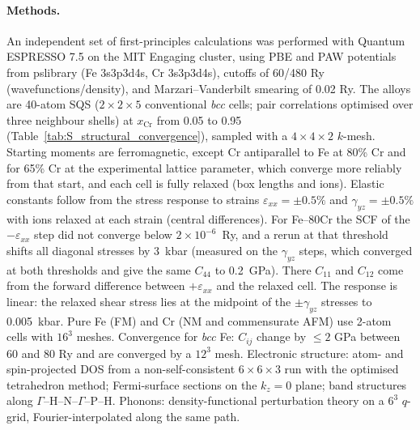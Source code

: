 \documentclass[final,3p,times]{elsarticle}
\begin{document}
\paragraph{Methods.} An independent set of first-principles calculations was performed with Quantum ESPRESSO 7.5 \cite{giannozzi2009quantum,giannozzi2017advanced} on the MIT Engaging cluster, using PBE \cite{pbe1996} and PAW potentials from pslibrary (Fe 3s3p3d4s, Cr 3s3p3d4s), cutoffs of 60/480 Ry (wavefunctions/density), and Marzari--Vanderbilt smearing of 0.02 Ry. The alloys are 40-atom SQS ($2\times2\times5$ conventional \textit{bcc} cells; pair correlations optimised over three neighbour shells) at $x_{\mathrm{Cr}}$ from 0.05 to 0.95 (Table~\ref{tab:S_structural_convergence}), sampled with a $4\times4\times2$ $k$-mesh. Starting moments are ferromagnetic, except Cr antiparallel to Fe at 80\% Cr and for 65\% Cr at the experimental lattice parameter, which converge more reliably from that start, and each cell is fully relaxed (box lengths and ions). Elastic constants follow from the stress response to strains $\varepsilon_{xx}=\pm0.5\%$ and $\gamma_{yz}=\pm0.5\%$ with ions relaxed at each strain (central differences). For Fe--80Cr the SCF of the $-\varepsilon_{xx}$ step did not converge below $2\times10^{-6}$~Ry, and a rerun at that threshold shifts all diagonal stresses by 3~kbar (measured on the $\gamma_{yz}$ steps, which converged at both thresholds and give the same $C_{44}$ to 0.2~GPa). There $C_{11}$ and $C_{12}$ come from the forward difference between $+\varepsilon_{xx}$ and the relaxed cell. The response is linear: the relaxed shear stress lies at the midpoint of the $\pm\gamma_{yz}$ stresses to 0.005~kbar. Pure Fe (FM) and Cr (NM and commensurate AFM) use 2-atom cells with $16^3$ meshes. Convergence for \textit{bcc} Fe: $C_{ij}$ change by $\leq2$ GPa between 60 and 80 Ry and are converged by a $12^3$ mesh. Electronic structure: atom- and spin-projected DOS from a non-self-consistent $6\times6\times3$ run with the optimised tetrahedron method; Fermi-surface sections on the $k_z=0$ plane; band structures along $\Gamma$--H--N--$\Gamma$--P--H. Phonons: density-functional perturbation theory on a $6^3$ $q$-grid, Fourier-interpolated along the same path.
\end{document}
